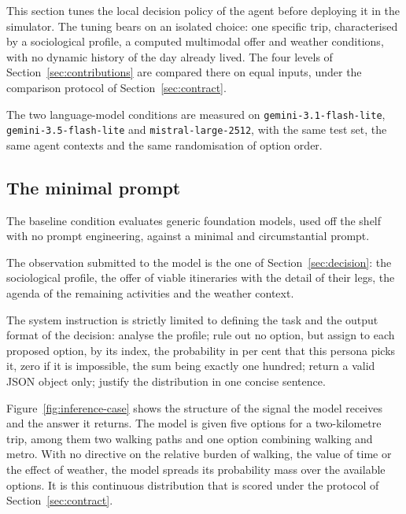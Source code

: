 This section tunes the local decision policy of the agent before deploying it in the simulator. The tuning bears on an isolated choice: one specific trip, characterised by a sociological profile, a computed multimodal offer and weather conditions, with no dynamic history of the day already lived. The four levels of Section~\ref{sec:contributions} are compared there on equal inputs, under the comparison protocol of Section~\ref{sec:contract}.

The two language-model conditions are measured on \texttt{gemini-3.1-flash-lite}, \texttt{gemini-3.5-flash-lite} and \texttt{mistral-large-2512}, with the same test set, the same agent contexts and the same randomisation of option order.

\subsection{The minimal prompt}
\label{sec:minimal-prompt}

The baseline condition evaluates generic foundation models, used off the shelf with no prompt engineering, against a minimal and circumstantial prompt.

The observation submitted to the model is the one of Section~\ref{sec:decision}: the sociological profile, the offer of viable itineraries with the detail of their legs, the agenda of the remaining activities and the weather context.

The system instruction is strictly limited to defining the task and the output format of the decision: analyse the profile; rule out no option, but assign to each proposed option, by its index, the probability in per cent that this persona picks it, zero if it is impossible, the sum being exactly one hundred; return a valid JSON object only; justify the distribution in one concise sentence.

Figure~\ref{fig:inference-case} shows the structure of the signal the model receives and the answer it returns. The model is given five options for a two-kilometre trip, among them two walking paths and one option combining walking and metro. With no directive on the relative burden of walking, the value of time or the effect of weather, the model spreads its probability mass over the available options. It is this continuous distribution that is scored under the protocol of Section~\ref{sec:contract}.

